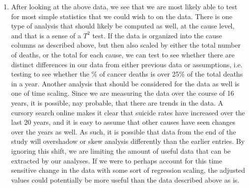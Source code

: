 \documentclass[letterpaper,10pt]{article}
\begin{document}
\begin{enumerate}
\begin{enumerate}
\item After looking at the above data, we see that we are most likely able to test for most simple statistics that we could wish to on the data. There is one type of analysis that should likely be computed as well, at the cause level, and that is a sense of a $T^2$ test. If the data is organized into the cause columns as described above, but then also scaled by either the total number of deaths, or the total for each cause, we can test to see whether there are distinct differences in our data from either previous data or assumptions, i.e. testing to see whether the \% of cancer deaths is over 25\% of the total deaths in a year. Another analysis that should be considered for the data as well is one of time scaling. Since we are measuring the data over the course of 16 years, it is possible, nay probable, that there are trends in the data. A cursory search online makes it clear that suicide rates have increased over the last 20 years, and it is easy to assume that other causes have seen changes over the years as well. As such, it is possible that data from the end of the study will overshadow or skew analysis differently than the earlier entries. By ignoring this shift, we are limiting the amount of useful data that can be extracted by our analyses. If we were to perhaps account for this time sensitive change in the data with some sort of regression scaling, the adjusted values could potentially be more useful than the data described above as is.
\end{enumerate}
\end{enumerate}
\end{document}

